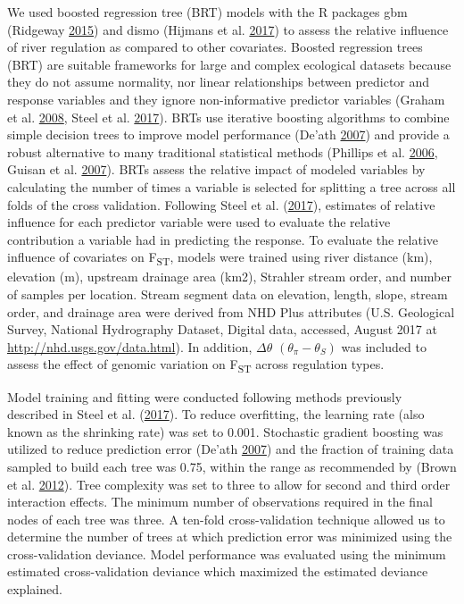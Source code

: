 \documentclass[twoside,12pt,final]{ucthesis-CA2012} %
\begin{document}
\begin{ucmainmatter}
We used boosted regression tree (BRT) models with the R packages gbm
(Ridgeway \protect\hyperlink{ref-ridgeway_gbm_2015}{2015}) and dismo
(Hijmans et al. \protect\hyperlink{ref-hijmans_dismo_2017}{2017}) to
assess the relative influence of river regulation as compared to other
covariates. Boosted regression trees (BRT) are suitable frameworks for
large and complex ecological datasets because they do not assume
normality, nor linear relationships between predictor and response
variables and they ignore non-informative predictor variables (Graham et
al. \protect\hyperlink{ref-graham_influence_2008}{2008}, Steel et al.
\protect\hyperlink{ref-steel_associating_2017}{2017}). BRTs use
iterative boosting algorithms to combine simple decision trees to
improve model performance (De'ath
\protect\hyperlink{ref-death_boosted_2007}{2007}) and provide a robust
alternative to many traditional statistical methods (Phillips et al.
\protect\hyperlink{ref-phillips_maximum_2006}{2006}, Guisan et al.
\protect\hyperlink{ref-guisan_what_2007}{2007}). BRTs assess the
relative impact of modeled variables by calculating the number of times
a variable is selected for splitting a tree across all folds of the
cross validation. Following Steel et al.
(\protect\hyperlink{ref-steel_associating_2017}{2017}), estimates of
relative influence for each predictor variable were used to evaluate the
relative contribution a variable had in predicting the response. To
evaluate the relative influence of covariates on F\textsubscript{ST},
models were trained using river distance (km), elevation (m), upstream
drainage area (km2), Strahler stream order, and number of samples per
location. Stream segment data on elevation, length, slope, stream order,
and drainage area were derived from NHD Plus attributes (U.S. Geological
Survey, National Hydrography Dataset, Digital data, accessed, August
2017 at \url{http://nhd.usgs.gov/data.html}). In addition,
\(\Delta \theta\) \((\theta_\pi - \theta_S)\) was included to assess the
effect of genomic variation on F\textsubscript{ST} across regulation
types.

Model training and fitting were conducted following methods previously
described in Steel et al.
(\protect\hyperlink{ref-steel_associating_2017}{2017}). To reduce
overfitting, the learning rate (also known as the shrinking rate) was
set to 0.001. Stochastic gradient boosting was utilized to reduce
prediction error (De'ath
\protect\hyperlink{ref-death_boosted_2007}{2007}) and the fraction of
training data sampled to build each tree was 0.75, within the range as
recommended by (Brown et al.
\protect\hyperlink{ref-brown_predicting_2012}{2012}). Tree complexity
was set to three to allow for second and third order interaction
effects. The minimum number of observations required in the final nodes
of each tree was three. A ten-fold cross-validation technique allowed us
to determine the number of trees at which prediction error was minimized
using the cross-validation deviance. Model performance was evaluated
using the minimum estimated cross-validation deviance which maximized
the estimated deviance explained.


\end{ucmainmatter}
\end{document}
